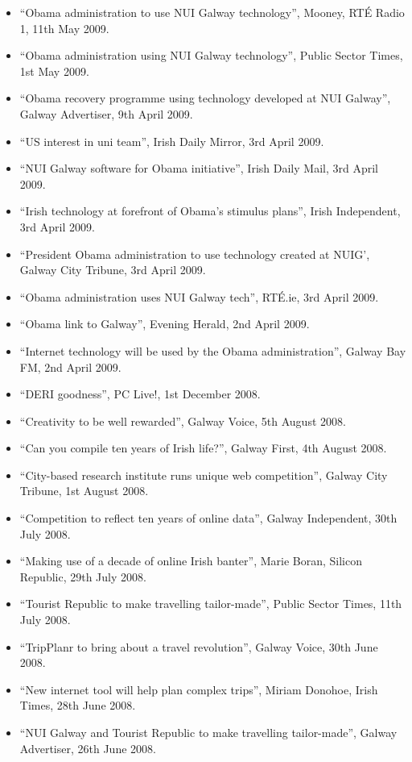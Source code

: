 \documentclass[10pt,a4paper]{res} %
\begin{document}
\begin{resume}
{\begin{itemize}
\item ``Obama administration to use NUI Galway technology'', Mooney, RT\'{E} Radio 1, 11th May 2009.
\item ``Obama administration using NUI Galway technology'', Public Sector Times, 1st May 2009.
\item ``Obama recovery programme using technology developed at NUI Galway'', Galway Advertiser, 9th April 2009.
\item ``US interest in uni team'', Irish Daily Mirror, 3rd April 2009.
\item ``NUI Galway software for Obama initiative'', Irish Daily Mail, 3rd April 2009.
\item ``Irish technology at forefront of Obama's stimulus plans'', Irish Independent, 3rd April 2009.
\item ``President Obama administration to use technology created at NUIG', Galway City Tribune, 3rd April 2009.
\item ``Obama administration uses NUI Galway tech'', RT\'{E}.ie, 3rd April 2009.
\item ``Obama link to Galway'', Evening Herald, 2nd April 2009.
\item ``Internet technology will be used by the Obama administration'', Galway Bay FM, 2nd April 2009.
\item ``DERI goodness'', PC Live!, 1st December 2008.
\item ``Creativity to be well rewarded'', Galway Voice, 5th August 2008.
\item ``Can you compile ten years of Irish life?'', Galway First, 4th August 2008.
\item ``City-based research institute runs unique web competition'', Galway City Tribune, 1st August 2008.
\item ``Competition to reflect ten years of online data'', Galway Independent, 30th July 2008.
\item ``Making use of a decade of online Irish banter'', Marie Boran, Silicon Republic, 29th July 2008.
\item ``Tourist Republic to make travelling tailor-made'', Public Sector Times, 11th July 2008.
\item ``TripPlanr to bring about a travel revolution'', Galway Voice, 30th June 2008.
\item ``New internet tool will help plan complex trips'', Miriam Donohoe, Irish Times, 28th June 2008.
\item ``NUI Galway and Tourist Republic to make travelling tailor-made'', Galway Advertiser, 26th June 2008.

\end{itemize}}
\end{resume}
\end{document}
